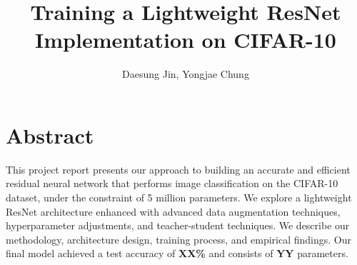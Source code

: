 \documentclass[letterpaper]{article} %
\title{Training a Lightweight ResNet Implementation on CIFAR-10}
\author{
    Daesung Jin, Yongjae Chung
}
\begin{document}
\maketitle


\section{Abstract}
This project report presents our approach to building an accurate and efficient residual neural network that performs image classification on the CIFAR-10 dataset, under the constraint of 5 million parameters. We explore a lightweight ResNet architecture enhanced with advanced data augmentation techniques, hyperparameter adjustments, and teacher-student techniques. We describe our methodology, architecture design, training process, and empirical findings. Our final model achieved a test accuracy of \textbf{XX\%} and consists of \textbf{YY} parameters.

\end{document}
